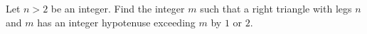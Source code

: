 Let $n>2$ be an integer. Find the integer $m$ such that a right triangle with legs $n$ and $m$ has an integer hypotenuse exceeding $m$ by $1$ or $2$.
